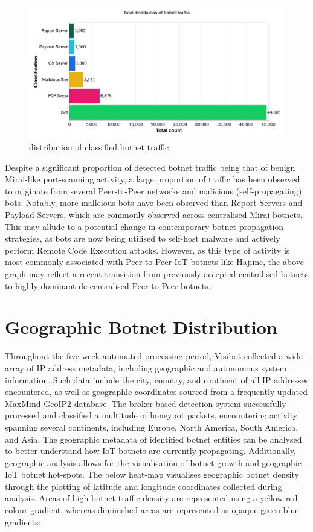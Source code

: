 \begin{figure}[!htb]
    \centering
    \includegraphics[width=0.75\linewidth]{results/botnet_distribution_histogram.png}
    \caption{distribution of classified botnet traffic.}
    \label{fig:botnet_distribution} 
\end{figure}

\newpage

Despite a significant proportion of detected botnet traffic being that of benign Mirai-like port-scanning activity, a large proportion of traffic has been observed to originate from several Peer-to-Peer networks and malicious (self-propagating) bots. Notably, more malicious bots have been observed than Report Servers and Payload Servers, which are commonly observed across centralised Mirai botnets. This may allude to a potential change in contemporary botnet propagation strategies, as bots are now being utilised to self-host malware and actively perform Remote Code Execution attacks. However, as this type of activity is most commonly associated with Peer-to-Peer IoT botnets like Hajime, the above graph may reflect a recent transition from previously accepted centralised botnets to highly dominant de-centralised Peer-to-Peer botnets.

\section{Geographic Botnet Distribution}

Throughout the five-week automated processing period, Visibot collected a wide array of IP address metadata, including geographic and autonomous system information. Such data include the city, country, and continent of all IP addresses encountered, as well as geographic coordinates sourced from a frequently updated MaxMind GeoIP2 database. The broker-based detection system successfully processed and classified a multitude of honeypot packets, encountering activity spanning several continents, including Europe, North America, South America, and Asia. The geographic metadata of identified botnet entities can be analysed to better understand how IoT botnets are currently propagating. Additionally, geographic analysis allows for the visualisation of botnet growth and geographic IoT botnet hot-spots. The below heat-map visualises geographic botnet density through the plotting of latitude and longitude coordinates collected during analysis. Areas of high botnet traffic density are represented using a yellow-red colour gradient, whereas diminished areas are represented as opaque green-blue gradients:

